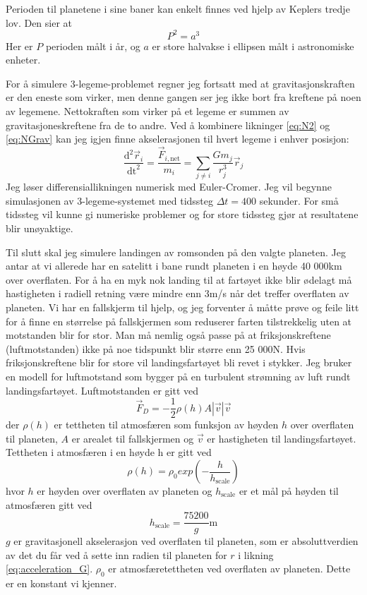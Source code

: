\documentclass[reprint,english,notitlepage]{revtex4-1}  %
\begin{document}
Perioden til planetene i sine baner kan enkelt finnes ved hjelp av Keplers tredje lov. Den sier at
\begin{equation}
  \label{eq:kepler}
  P^2 = a^3
\end{equation}
Her er $P$ perioden målt i år, og $a$ er store halvakse i ellipsen målt i astronomiske enheter.

For å simulere 3-legeme-problemet regner jeg fortsatt med at gravitasjonskraften er den eneste som virker, men denne gangen ser jeg ikke bort fra kreftene på noen av legemene. Nettokraften som virker på et legeme er summen av gravitasjoneskreftene fra de to andre. Ved å kombinere likninger \ref{eq:N2} og \ref{eq:NGrav} kan jeg igjen finne akselerasjonen til hvert legeme i enhver posisjon: \[\frac{\mathrm{d}^2 \vec{r}_i}{\mathrm{dt}^2} = \frac{\vec{F}_{i, \text{net}}}{m_i} = \sum_{j \neq i} \frac{G m_j}{r_j^3} \vec{r}_j \] Jeg løser differensiallikningen numerisk med Euler-Cromer. Jeg vil begynne simulasjonen av 3-legeme-systemet med tidssteg $\Delta t = 400$ sekunder. For små tidssteg vil kunne gi numeriske problemer og for store tidssteg gjør at resultatene blir unøyaktige.

Til slutt skal jeg simulere landingen av romsonden på den valgte planeten. Jeg antar at vi allerede har en satelitt i bane rundt planeten i en høyde 40 000km over overflaten. For å ha en myk nok landing til at fartøyet ikke blir ødelagt må hastigheten i radiell retning være mindre enn 3m/s når det treffer overflaten av planeten. Vi har en fallskjerm til hjelp, og jeg forventer å måtte prøve og feile litt for å finne en størrelse på fallskjermen som reduserer farten tilstrekkelig uten at motstanden blir for stor. Man må nemlig også passe på at friksjonskreftene (luftmotstanden) ikke på noe tidspunkt blir større enn 25 000N. Hvis friksjonskreftene blir for store vil landingsfartøyet bli revet i stykker. Jeg bruker en modell for luftmotstand som bygger på en turbulent strømning av luft rundt landingsfartøyet. Luftmotstanden er gitt ved
 \begin{equation}
   \label{eq:drag}
   \vec{F}_D = - \frac{1}{2}\rho(h)A |\vec{v}| \vec{v}
 \end{equation}
 der $\rho(h)$ er tettheten til atmosfæren som funksjon av høyden $h$ over overflaten til planeten, $A$ er arealet til fallskjermen og $\vec{v}$ er hastigheten til landingsfartøyet. Tettheten i atmosfæren i en høyde h er gitt ved
 \begin{equation}
   \label{eq:density}
   \rho(h) = \rho_0 exp(-\frac{h}{h_{\text{scale}}})
 \end{equation}
 hvor $h$ er høyden over overflaten av planeten og $h_{\text{scale}}$ er et mål på høyden til atmosfæren gitt ved
 \[
 h_{\text{scale}} = \frac{75200}{g} \text{m}
 \]
 $g$ er gravitasjonell akselerasjon ved overflaten til planeten, som er absoluttverdien av det du får ved å sette inn radien til planeten for $r$ i likning \ref{eq:acceleration_G}. $\rho_0$ er atmosfæretettheten ved overflaten av planeten. Dette er en konstant vi kjenner.
\end{document}

